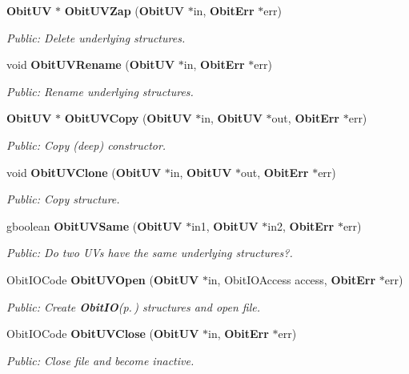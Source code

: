 \begin{CompactItemize}
{\bf Obit\-UV} $\ast$ {\bf Obit\-UVZap} ({\bf Obit\-UV} $\ast$in, {\bf Obit\-Err} $\ast$err)
\begin{CompactList}\small\item\em Public: Delete underlying structures. \item\end{CompactList}\item 
void {\bf Obit\-UVRename} ({\bf Obit\-UV} $\ast$in, {\bf Obit\-Err} $\ast$err)
\begin{CompactList}\small\item\em Public: Rename underlying structures. \item\end{CompactList}\item 
{\bf Obit\-UV} $\ast$ {\bf Obit\-UVCopy} ({\bf Obit\-UV} $\ast$in, {\bf Obit\-UV} $\ast$out, {\bf Obit\-Err} $\ast$err)
\begin{CompactList}\small\item\em Public: Copy (deep) constructor. \item\end{CompactList}\item 
void {\bf Obit\-UVClone} ({\bf Obit\-UV} $\ast$in, {\bf Obit\-UV} $\ast$out, {\bf Obit\-Err} $\ast$err)
\begin{CompactList}\small\item\em Public: Copy structure. \item\end{CompactList}\item 
gboolean {\bf Obit\-UVSame} ({\bf Obit\-UV} $\ast$in1, {\bf Obit\-UV} $\ast$in2, {\bf Obit\-Err} $\ast$err)
\begin{CompactList}\small\item\em Public: Do two UVs have the same underlying structures?. \item\end{CompactList}\item 
Obit\-IOCode {\bf Obit\-UVOpen} ({\bf Obit\-UV} $\ast$in, Obit\-IOAccess access, {\bf Obit\-Err} $\ast$err)
\begin{CompactList}\small\item\em Public: Create {\bf Obit\-IO}{\rm (p.\,\pageref{structObitIO})} structures and open file. \item\end{CompactList}\item 
Obit\-IOCode {\bf Obit\-UVClose} ({\bf Obit\-UV} $\ast$in, {\bf Obit\-Err} $\ast$err)
\begin{CompactList}\small\item\em Public: Close file and become inactive. \item\end{CompactList}\item 

\end{CompactItemize}
